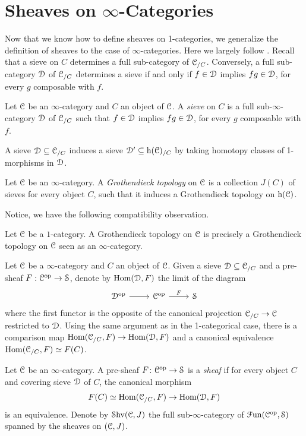 \documentclass[10pt]{amsart}
\begin{document}
	\section{Sheaves on \texorpdfstring{$\infty$}{oo}-Categories}
	Now that we know how  to define sheaves on 1-categories, we generalize the definition of sheaves to the case of $\infty$-categories. Here we largely follow \cite{lurie2009htt}. Recall that a sieve on $C$ determines a full sub-category of $\mathcal{C}_{/C}$. Conversely, a full sub-category $\mathcal{D}$ of $\mathcal{C}_{/C}$ determines a sieve if and only if $f\in\mathcal{D}$ implies $fg\in\mathcal{D}$, for every $g$ composable with $f$. 
	\begin{definition}
		Let $\mathcal{C}$ be an $\infty$-category and $C$ an object of $\mathcal{C}$. A \textit{sieve} on $C$ is a full sub-$\infty$-category $\mathcal{D}$ of $\mathcal{C}_{/C}$ such that $f\in\mathcal{D}$ implies $fg\in\mathcal{D}$, for every $g$ composable with $f$.  
	\end{definition}
	A sieve $\mathcal{D}\subseteq\mathcal{C}_{/C}$ induces a sieve $\mathcal{D}'\subseteq\mathrm{h}(\mathcal{C})_{/C}$ by taking homotopy classes of 1-morphisms in $\mathcal{D}$. 
	\begin{definition}
		Let $\mathcal{C}$ be an $\infty$-category. A \emph{Grothendieck topology} on $\mathcal{C}$ is a collection $J(C)$ of sieves for every object $C$, such that it induces a Grothendieck topology on $\mathrm{h}(\mathcal{C})$. 
	\end{definition}
	
	Notice, we have the following compatibility observation.
	\begin{lemma}
		Let $\mathcal{C}$ be a $1$-category. A Grothendieck topology on $\mathcal{C}$ is precisely a Grothendieck topology on $\mathcal{C}$ seen as an $\infty$-category.
	\end{lemma}
	\begin{definition}
		Let $\mathcal{C}$ be a $\infty$-category and $C$ an object of $\mathcal{C}$. Given a sieve $\mathcal{D}\subseteq\mathcal{C}_{/C}$ and a pre-sheaf $F:\mathcal{C}^{\mathrm{op}}\to\mathcal{S}$, denote by $\mathrm{Hom}(\mathcal{D},F)$ the limit of the diagram \begin{equation}
		\begin{tikzcd}
			\lD^{\op}\arrow[r] & \lC^{\op}\arrow[r,"F"] & \lS
		\end{tikzcd}
	\end{equation}where the first functor is the opposite of the canonical projection $\mathcal{C}_{/C}\to\mathcal{C}$ restricted to $\mathcal{D}$. Using the same argument as in the 1-categorical case, there is a comparison map $\mathrm{Hom}(\mathcal{C}_{/C},F)\to\mathrm{Hom}(\mathcal{D},F)$ and a canonical equivalence $\mathrm{Hom}(\mathcal{C}_{/C},F)\simeq F(C)$. 
	\end{definition}
	\begin{definition}
		Let $\mathcal{C}$ be an $\infty$-category. A pre-sheaf $F\colon\mathcal{C}^{\mathrm{op}}\to\mathcal{S}$ is a \emph{sheaf} if for every object $C$ and covering sieve $\mathcal{D}$ of $C$, the canonical morphism
		\[ F(C)\simeq\mathrm{Hom}(\mathcal{C}_{/C},F) \to \mathrm{Hom}(\mathcal{D},F) \]
		is an equivalence. Denote by $\mathcal{S}\mathrm{hv}(\mathcal{C},J)$ the full sub-$\infty$-category of $\mathcal{F}\mathrm{un}(\mathcal{C}^{\mathrm{op}},\mathcal{S})$ spanned by the sheaves on $(\mathcal{C},J)$.
	\end{definition}
	
\end{document}
